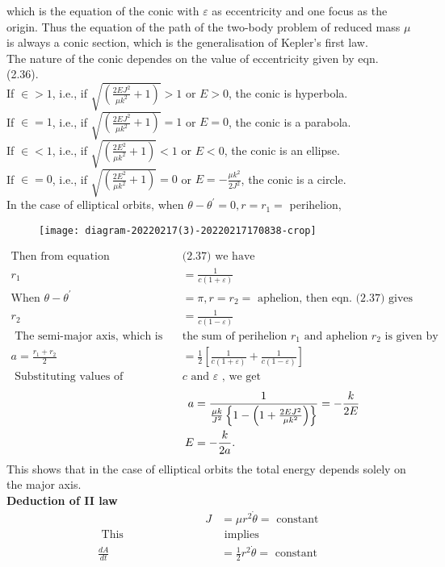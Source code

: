 which is the equation of the conic with $\varepsilon$ as eccentricity and one focus as the origin. Thus the equation of the path of the two-body problem of reduced mass $\mu$ is always a conic section, which is the generalisation of Kepler's first law.\\
The nature of the conic dependes on the value of eccentricity given by eqn. (2.36).\\
 If $\in>1$, i.e., if $\sqrt{\left(\frac{2 E J^{2}}{\mu k^{2}}+1\right)}>1$ or $E>0$, the conic is hyperbola.\\
 If $\in=1$, i.e., if $\sqrt{\left(\frac{2 E J^{2}}{\mu k^{2}}+1\right)}=1$ or $E=0$, the conic is a parabola.\\
  If $\in<1$, i.e., if $\sqrt{\left(\frac{2 E^{2}}{\mu k^{2}}+1\right)}<1$ or $E<0$, the conic is an ellipse.\\
   If $\in=0$, i.e., if $\sqrt{\left(\frac{2 E^{2}}{\mu k^{2}}+1\right)}=0$ or $E=-\frac{\mu k^{2}}{2 J^{2}}$, the conic is a circle.\\
    In the case of elliptical orbits, when $\theta-\theta^{\prime}=0, r=r_{1}=$ perihelion,\\
    \begin{figure}[H]
    	\centering
    	\texttt{[image: diagram-20220217(3)-20220217170838-crop]}
    	\caption{}
    	\label{}
    \end{figure}
\begin{align*}
\text{Then from equation }&\text{(2.37) we have}\\
r_{1}&=\frac{1}{c(1+\varepsilon)}\\
\text{When }\theta-\theta^{\prime}&=\pi, r=r_{2}=\text{ aphelion, then eqn. (2.37) gives}\\
r_{2}&=\frac{1}{c(1-\varepsilon)}\\
\text{ The semi-major axis, which is one-half }&\text{the sum of perihelion $r_{1}$ and aphelion $r_{2}$ is given by}\\
 a=\frac{r_{1}+r_{2}}{2}&=\frac{1}{2}\left[\frac{1}{c(1+\varepsilon)}+\frac{1}{c(1-\varepsilon)}\right]\\
 \text{ Substituting values of }&\text{$c$ and $\varepsilon$ , we get}
\end{align*}
 \begin{align}
   \hspace{4cm}a&=\frac{1}{\frac{\mu k}{J^{2}}\left\{1-\left(1+\frac{2 E J^{2}}{\mu k^{2}}\right)\right\}}=-\frac{k}{2 E} \notag \\
    E&=-\frac{k}{2 a} .
 \end{align}
  This shows that in the case of elliptical orbits the total energy depends solely on the major axis.\\
  \textbf{Deduction of II law}\\
  \begin{align*}
  \hspace{4cm} J&=\mu r^{2} \dot{\theta}=\text { constant }\\
 \text{ This}&\text{ implies}\\
  \frac{d A}{d t}&=\frac{1}{2} r^{2} \dot{\theta}=\text { constant }
  \end{align*}
 
